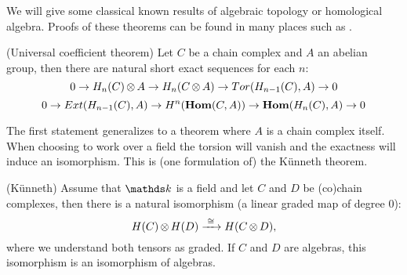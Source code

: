 We will give some classical known results of algebraic topology or homological algebra. Proofs of these theorems can be found in many places such as \cite{rotman, weibel}.

\begin{theorem}
	(Universal coefficient theorem) Let $C$ be a chain complex and $A$ an abelian group, then there are natural short exact sequences for each $n$:
	$$ 0 \to H_n(C) \operatorname*{\otimes} A \to H_n(C \operatorname*{\otimes} A) \to Tor(H_{n-1}(C), A) \to 0 $$
	$$ 0 \to Ext(H_{n-1}(C), A) \to H^n(\mathbf{Hom}(C, A)) \to \mathbf{Hom}(H_n(C), A) \to 0 $$
\end{theorem}

The first statement generalizes to a theorem where $A$ is a chain complex itself. When choosing to work over a field the torsion will vanish and the exactness will induce an isomorphism. This is (one formulation of) the Künneth theorem.

\begin{theorem}
	(Künneth) Assume that $\k$ is a field and let $C$ and $D$ be (co)chain complexes, then there is a natural isomorphism (a linear graded map of degree $0$):
	$$ H(C) \operatorname*{\otimes} H(D) \xrightarrow{\,\,{\cong}\,\,} H(C \operatorname*{\otimes} D), $$
	where we understand both tensors as graded. If $C$ and $D$ are algebras, this isomorphism is an isomorphism of algebras.
\end{theorem}
